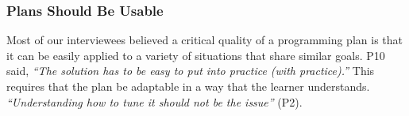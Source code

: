 


\subsubsection{Plans Should Be Usable}
\label{sec:usability}
Most of our interviewees believed a critical quality of a programming plan is that it can be easily applied to a variety of situations that share similar goals. 
P10 said, \textit{``The solution has to be easy to put into practice (with practice).''}
This requires that the plan be adaptable in a way that the learner understands. %
\textit{``Understanding how to tune it should not be the issue''} (P2).

%

